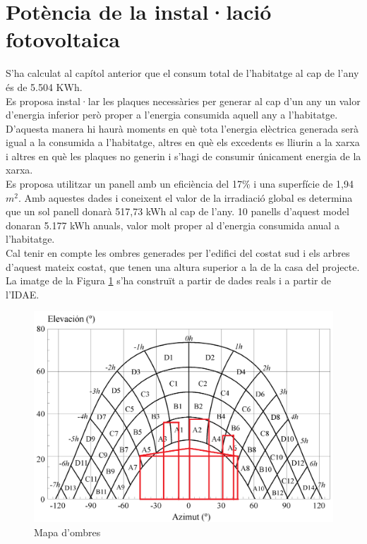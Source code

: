 \section{Potència de la instal·lació fotovoltaica}
S'ha calculat al capítol anterior que el consum total de l'habitatge al cap de l'any és de 5.504 KWh.\\
\newline Es proposa instal·lar les plaques necessàries per generar al cap d'un any un  valor d'energia inferior però proper a l'energia consumida aquell any a l'habitatge. D'aquesta manera hi haurà moments en què tota l'energia elèctrica generada serà igual a la consumida a l'habitatge, altres en què els excedents es lliurin a la xarxa i altres en què les plaques no generin i s'hagi de consumir únicament energia de la xarxa.\\
\newline Es proposa utilitzar un panell amb un eficiència del 17\% i una superfície de 1,94 $m^2$. Amb aquestes dades i coneixent el valor de la irradiació global es determina que un sol panell donarà 517,73 kWh al cap de l'any. 10 panells d'aquest model donaran 5.177 kWh anuals, valor molt proper al d'energia consumida anual a l'habitatge.\\
\newline Cal tenir en compte les ombres generades per l'edifici del costat sud i els arbres d'aquest mateix costat, que tenen una altura superior a la de la casa del projecte. La imatge de la Figura \ref{fig: ombres} s'ha construït a partir de dades reals i a partir de l'IDAE.
\begin{figure}[H]
\begin{center}
\includegraphics[scale=0.45]{images/o2.png}
\end{center}
\caption{Mapa d'ombres}
\label{fig: ombres}
\end{figure}

